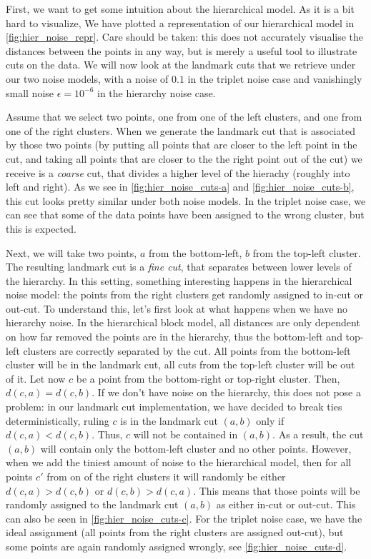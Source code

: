 First, we want to get some intuition about the hierarchical model.
As it is a bit hard to visualize, We have plotted a representation of our hierarchical model in \autoref{fig:hier_noise_repr}. Care should be taken: this does not accurately visualise the distances between
the points in any way, but is merely a useful tool to illustrate cuts on the data. We will now look at the landmark cuts that we retrieve under our two noise models, with a noise of $0.1$ in the triplet noise case and vanishingly small noise $\epsilon = 10^{-6}$ in the hierarchy noise case. 

Assume that we select two points, one from one of the left clusters, and one from one of the right clusters. When we generate the landmark cut that is associated by those two points
(by putting all points that are closer to the left point in the cut, and taking all points that are closer to the the right point out of the cut) we receive is a \textit{coarse} cut, that divides
a higher level of the hierachy (roughly into left and right). As we see in \autoref{fig:hier_noise_cuts-a} and \autoref{fig:hier_noise_cuts-b}, this cut looks pretty similar under both noise models. 
In the triplet noise case, we can see that  some of the data points have been assigned to the wrong cluster, but this is expected. 

Next, we will take two points, $a$ from the bottom-left, $b$ from the top-left cluster. The resulting landmark cut is a \textit{fine cut}, that separates between lower levels of the hierarchy.
In this setting, something interesting happens in the hierarchical noise model: the points from the right clusters get randomly assigned to in-cut or out-cut. To understand this, let's first look at what happens when we have no hierarchy noise. 
In the hierarchical block model, all distances are only dependent on how far removed the points are in the hierarchy, thus the bottom-left and top-left clusters are correctly separated by the cut. All points from
the bottom-left cluster will be in the landmark cut, all cuts from the top-left cluster
will be out of it.
Let now $c$ be a point from the bottom-right or top-right cluster. Then, $d(c,a) = d(c,b)$. 
If we don't have noise on the hierarchy, this does not pose a problem: in our landmark cut implementation, we have decided to break ties deterministically, ruling $c$ is in the landmark cut $(a,b)$ only if $d(c,a) < d(c,b)$. Thus, $c$ will not be contained in $(a,b)$. As a result, the cut $(a,b)$ will contain 
only the bottom-left cluster and no other points.
However, when we add the tiniest amount of noise to the hierarchical model, then for all points $c'$ from on of the right clusters 
it will randomly be either $d(c,a) > d(c,b)$ or $d(c,b) > d(c,a)$. This means that those points will be randomly assigned to the landmark cut $(a,b)$ as either in-cut or out-cut. 
This can also be seen in \autoref{fig:hier_noise_cuts-c}. For the triplet noise case, we have the ideal assignment (all points from the right clusters are assigned out-cut), 
but some points are again randomly assigned wrongly, see \autoref{fig:hier_noise_cuts-d}.

